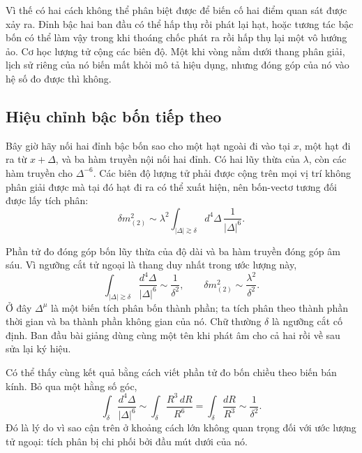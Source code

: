 Vì thế có hai cách không thể phân biệt được để biến cố hai điểm quan sát được xảy ra. Đỉnh bậc hai ban đầu có thể hấp thụ rồi phát lại hạt, hoặc tương tác bậc bốn có thể làm vậy trong khi thoáng chốc phát ra rồi hấp thụ lại một vô hướng ảo. Cơ học lượng tử cộng các biên độ. Một khi vòng nằm dưới thang phân giải, lịch sử riêng của nó biến mất khỏi mô tả hiệu dụng, nhưng đóng góp của nó vào hệ số đo được thì không.

\subsection{Hiệu chỉnh bậc bốn tiếp theo}

Bây giờ hãy nối hai đỉnh bậc bốn sao cho một hạt ngoài đi vào tại \(x\), một hạt đi ra từ \(x+\Delta\), và ba hàm truyền nội nối hai đỉnh. Có hai lũy thừa của \(\lambda\), còn các hàm truyền cho \(\Delta^{-6}\). Các biên độ lượng tử phải được cộng trên mọi vị trí không phân giải được mà tại đó hạt đi ra có thể xuất hiện, nên bốn-vectơ tương đối được lấy tích phân:
\begin{equation}
\delta m^2_{(2)}
\sim
\lambda^2
\int_{|\Delta|\gtrsim\delta}
d^4\Delta\,\frac{1}{|\Delta|^6}.
\label{eq:two-loop-power-count}
\end{equation}

\begin{classroomqa}
\end{classroomqa}

Phần tử đo đóng góp bốn lũy thừa của độ dài và ba hàm truyền đóng góp âm sáu. Vì ngưỡng cắt tử ngoại là thang duy nhất trong ước lượng này,
\begin{equation}
\int_{|\Delta|\gtrsim\delta}
\frac{d^4\Delta}{|\Delta|^6}
\sim\frac{1}{\delta^2},
\qquad
\delta m^2_{(2)}
\sim\frac{\lambda^2}{\delta^2}.
\label{eq:two-loop-scalar-mass}
\end{equation}
Ở đây \(\Delta^\mu\) là một biến tích phân bốn thành phần; ta tích phân theo thành phần thời gian và ba thành phần không gian của nó. Chữ thường \(\delta\) là ngưỡng cắt cố định. Ban đầu bài giảng dùng cùng một tên khi phát âm cho cả hai rồi về sau sửa lại ký hiệu.

Có thể thấy cùng kết quả bằng cách viết phần tử đo bốn chiều theo biến bán kính. Bỏ qua một hằng số góc,
\begin{equation}
\int_{\delta}\frac{d^4\Delta}{|\Delta|^6}
\sim
\int_{\delta}\frac{R^3\,dR}{R^6}
=\int_{\delta}\frac{dR}{R^3}
\sim\frac{1}{\delta^2}.
\end{equation}
Đó là lý do vì sao cận trên ở khoảng cách lớn không quan trọng đối với ước lượng tử ngoại: tích phân bị chi phối bởi đầu mút dưới của nó.


